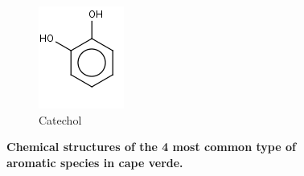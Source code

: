 \begin{figure}[H]
\begin{subfigure}[b]{.19\textwidth}
\includegraphics[width=\textwidth]{figures_c3/CATECHOL.png}
\caption{Catechol}
\end{subfigure}
\caption{\textbf{Chemical structures of the 4 most common type of aromatic species in cape verde.}}
\label{fig:aromaticbz}
\end{figure}

  

